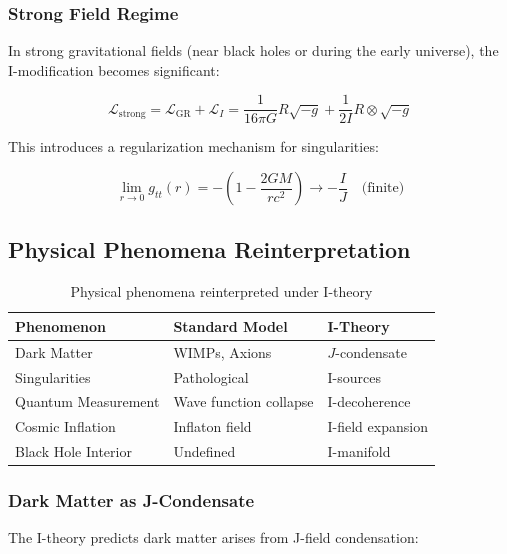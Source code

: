 \subsubsection{Strong Field Regime}

In strong gravitational fields (near black holes or during the early universe), the I-modification becomes significant:

\begin{equation}
\label{eq:strong_field_correction}
\mathcal{L}_{\text{strong}} = \mathcal{L}_{\text{GR}} + \mathcal{L}_I = \frac{1}{16\pi G}R\sqrt{-g} + \frac{1}{2I}R\otimes\sqrt{-g}
\end{equation}

This introduces a regularization mechanism for singularities:

\begin{equation}
\label{eq:singularity_regularization}
\lim_{r\to 0} g_{tt}(r) = -\left(1 - \frac{2GM}{rc^2}\right) \to -\frac{I}{J} \quad \text{(finite)}
\end{equation}

\subsection{Physical Phenomena Reinterpretation}

\begin{table}[h]
\centering
\caption{Physical phenomena reinterpreted under I-theory}
\label{tab:phenomena_reinterpretation}
\begin{tabular}{|l|l|l|}
\hline
\textbf{Phenomenon} & \textbf{Standard Model} & \textbf{I-Theory} \\
\hline
Dark Matter & WIMPs, Axions & $J$-condensate \\
Singularities & Pathological & I-sources \\
Quantum Measurement & Wave function collapse & I-decoherence \\
Cosmic Inflation & Inflaton field & I-field expansion \\
Black Hole Interior & Undefined & I-manifold \\
\hline
\end{tabular}
\end{table}

\subsubsection{Dark Matter as J-Condensate}

The I-theory predicts dark matter arises from J-field condensation:

